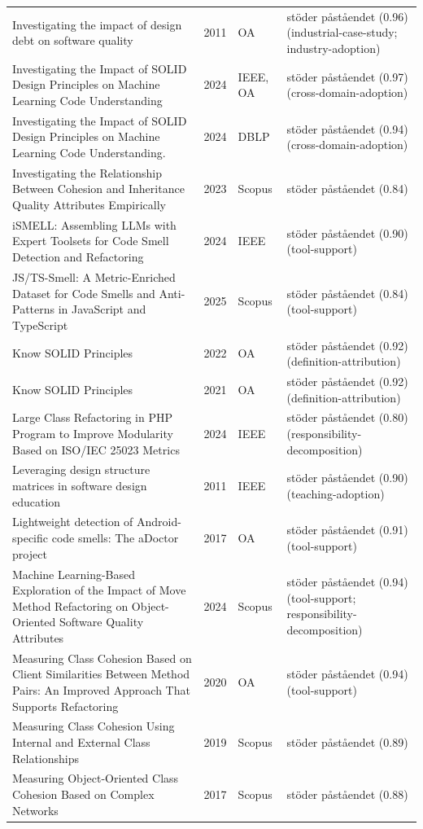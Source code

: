 \begin{longtable}{@{}%
  >{\raggedright\arraybackslash}p{}c%
  >{\raggedright\arraybackslash}p{}%
  >{\raggedright\arraybackslash}p{}@{}}
Investigating the impact of design debt on software quality & 2011 & OA & stöder påståendet (0.96) (industrial-case-study; industry-adoption) \\
Investigating the Impact of SOLID Design Principles on Machine Learning Code Understanding & 2024 & IEEE, OA & stöder påståendet (0.97) (cross-domain-adoption) \\
Investigating the Impact of SOLID Design Principles on Machine Learning Code Understanding. & 2024 & DBLP & stöder påståendet (0.94) (cross-domain-adoption) \\
Investigating the Relationship Between Cohesion and Inheritance Quality Attributes Empirically & 2023 & Scopus & stöder påståendet (0.84) \\
iSMELL: Assembling LLMs with Expert Toolsets for Code Smell Detection and Refactoring & 2024 & IEEE & stöder påståendet (0.90) (tool-support) \\
JS/TS-Smell: A Metric-Enriched Dataset for Code Smells and Anti-Patterns in JavaScript and TypeScript & 2025 & Scopus & stöder påståendet (0.84) (tool-support) \\
Know SOLID Principles & 2022 & OA & stöder påståendet (0.92) (definition-attribution) \\
Know SOLID Principles & 2021 & OA & stöder påståendet (0.92) (definition-attribution) \\
Large Class Refactoring in PHP Program to Improve Modularity Based on ISO/IEC 25023 Metrics & 2024 & IEEE & stöder påståendet (0.80) (responsibility-decomposition) \\
Leveraging design structure matrices in software design education & 2011 & IEEE & stöder påståendet (0.90) (teaching-adoption) \\
Lightweight detection of Android-specific code smells: The aDoctor project & 2017 & OA & stöder påståendet (0.91) (tool-support) \\
Machine Learning-Based Exploration of the Impact of Move Method Refactoring on Object-Oriented Software Quality Attributes & 2024 & Scopus & stöder påståendet (0.94) (tool-support; responsibility-decomposition) \\
Measuring Class Cohesion Based on Client Similarities Between Method Pairs: An Improved Approach That Supports Refactoring & 2020 & OA & stöder påståendet (0.94) (tool-support) \\
Measuring Class Cohesion Using Internal and External Class Relationships & 2019 & Scopus & stöder påståendet (0.89) \\
Measuring Object-Oriented Class Cohesion Based on Complex Networks & 2017 & Scopus & stöder påståendet (0.88) \\

\end{longtable}
